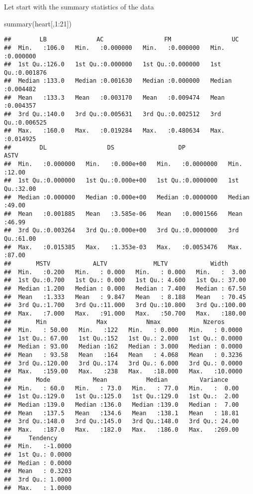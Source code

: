\documentclass[
]{article}
\newenvironment{Shaded}{\begin{snugshade}}{\end{snugshade}}
\newcommand{\DecValTok}[1]{\textcolor[rgb]{0.00,0.00,0.81}{#1}}
\newcommand{\FunctionTok}[1]{\textcolor[rgb]{0.00,0.00,0.00}{#1}}
\newcommand{\NormalTok}[1]{#1}
\newcommand{\SpecialCharTok}[1]{\textcolor[rgb]{0.00,0.00,0.00}{#1}}
\begin{document}
Let start with the summary statistics of the data

\begin{Shaded}
\begin{Highlighting}[]
\FunctionTok{summary}\NormalTok{(heart[,}\DecValTok{1}\SpecialCharTok{:}\DecValTok{21}\NormalTok{])}
\end{Highlighting}
\end{Shaded}

\begin{verbatim}
##        LB              AC                 FM                 UC          
##  Min.   :106.0   Min.   :0.000000   Min.   :0.000000   Min.   :0.000000  
##  1st Qu.:126.0   1st Qu.:0.000000   1st Qu.:0.000000   1st Qu.:0.001876  
##  Median :133.0   Median :0.001630   Median :0.000000   Median :0.004482  
##  Mean   :133.3   Mean   :0.003170   Mean   :0.009474   Mean   :0.004357  
##  3rd Qu.:140.0   3rd Qu.:0.005631   3rd Qu.:0.002512   3rd Qu.:0.006525  
##  Max.   :160.0   Max.   :0.019284   Max.   :0.480634   Max.   :0.014925  
##        DL                 DS                  DP                 ASTV      
##  Min.   :0.000000   Min.   :0.000e+00   Min.   :0.0000000   Min.   :12.00  
##  1st Qu.:0.000000   1st Qu.:0.000e+00   1st Qu.:0.0000000   1st Qu.:32.00  
##  Median :0.000000   Median :0.000e+00   Median :0.0000000   Median :49.00  
##  Mean   :0.001885   Mean   :3.585e-06   Mean   :0.0001566   Mean   :46.99  
##  3rd Qu.:0.003264   3rd Qu.:0.000e+00   3rd Qu.:0.0000000   3rd Qu.:61.00  
##  Max.   :0.015385   Max.   :1.353e-03   Max.   :0.0053476   Max.   :87.00  
##       MSTV            ALTV             MLTV            Width       
##  Min.   :0.200   Min.   : 0.000   Min.   : 0.000   Min.   :  3.00  
##  1st Qu.:0.700   1st Qu.: 0.000   1st Qu.: 4.600   1st Qu.: 37.00  
##  Median :1.200   Median : 0.000   Median : 7.400   Median : 67.50  
##  Mean   :1.333   Mean   : 9.847   Mean   : 8.188   Mean   : 70.45  
##  3rd Qu.:1.700   3rd Qu.:11.000   3rd Qu.:10.800   3rd Qu.:100.00  
##  Max.   :7.000   Max.   :91.000   Max.   :50.700   Max.   :180.00  
##       Min              Max           Nmax            Nzeros       
##  Min.   : 50.00   Min.   :122   Min.   : 0.000   Min.   : 0.0000  
##  1st Qu.: 67.00   1st Qu.:152   1st Qu.: 2.000   1st Qu.: 0.0000  
##  Median : 93.00   Median :162   Median : 3.000   Median : 0.0000  
##  Mean   : 93.58   Mean   :164   Mean   : 4.068   Mean   : 0.3236  
##  3rd Qu.:120.00   3rd Qu.:174   3rd Qu.: 6.000   3rd Qu.: 0.0000  
##  Max.   :159.00   Max.   :238   Max.   :18.000   Max.   :10.0000  
##       Mode            Mean           Median         Variance     
##  Min.   : 60.0   Min.   : 73.0   Min.   : 77.0   Min.   :  0.00  
##  1st Qu.:129.0   1st Qu.:125.0   1st Qu.:129.0   1st Qu.:  2.00  
##  Median :139.0   Median :136.0   Median :139.0   Median :  7.00  
##  Mean   :137.5   Mean   :134.6   Mean   :138.1   Mean   : 18.81  
##  3rd Qu.:148.0   3rd Qu.:145.0   3rd Qu.:148.0   3rd Qu.: 24.00  
##  Max.   :187.0   Max.   :182.0   Max.   :186.0   Max.   :269.00  
##     Tendency      
##  Min.   :-1.0000  
##  1st Qu.: 0.0000  
##  Median : 0.0000  
##  Mean   : 0.3203  
##  3rd Qu.: 1.0000  
##  Max.   : 1.0000
\end{verbatim}
\end{document}
